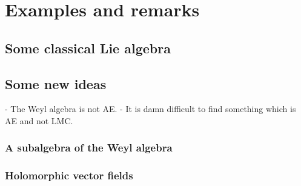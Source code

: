 
%
%

\chapter{Examples and remarks}

\section{Some classical Lie algebra}
\label{sec:chap8_ClassicalExamples}



\section{Some new ideas}
\label{sec:chap8_NewExamples}

 - The Weyl algebra is not AE.
 - It is damn difficult to find something which is AE and not LMC.

\subsection{A subalgebra of the Weyl algebra}

\subsection{Holomorphic vector fields}
